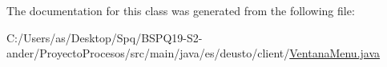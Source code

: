 The documentation for this class was generated from the following file\+:\begin{DoxyCompactItemize}
\item 
C\+:/\+Users/as/\+Desktop/\+Spq/\+B\+S\+P\+Q19-\/\+S2-\/ander/\+Proyecto\+Procesos/src/main/java/es/deusto/client/\mbox{\hyperlink{_ventana_menu_8java}{Ventana\+Menu.\+java}}\end{DoxyCompactItemize}
